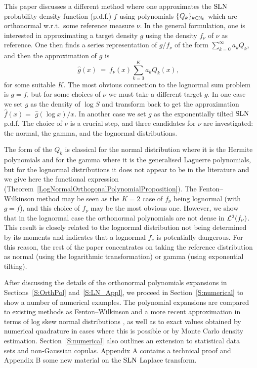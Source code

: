 This paper discusses a different method where one approximates the $\mathrm{SLN}$ probability density function (p.d.f.) $f$ using polynomials $\{Q_k\}_{k\in\mathbb{N}_0}$ which are orthonormal w.r.t.\ some reference
measure $\nu$. In the general formulation, one is interested in approximating a target density $g$ using the density $f_\nu$ of $\nu$
as reference. One then finds
a series representation of $g/f_\nu$ of the form $\sum_{k=0}^\infty a_k Q_k$,
and then the approximation of $g$ is
\begin{equation} \label{orthog_approx}
	\widehat{g}(x)\ =\ f_\nu(x) \sum_{k=0}^K a_k Q_k(x),
\end{equation}
for some suitable $K$.
The most obvious connection to the lognormal sum problem is $g=f$, but for some choices of $\nu$ we must take a different target $g$. In one case we set $g$ as the density of $\log S$ and transform back to get the approximation $\widehat{f}(x)=$
$\widehat{g}(\log x)/x$. In another case we set $g$ as the exponentially tilted $\mathrm{SLN}$ p.d.f.
The choice of $\nu$ is a crucial step, and
three candidates for $\nu$ are investigated: the normal, the gamma, and the lognormal distributions.

The form of the $Q_k$ is classical for the normal distribution where it is the Hermite polynomials and for the gamma where  it is the generalised Laguerre polynomials,
but for the lognormal distributions it does not appear to be in the literature and we give here  the functional expression
(Theorem~\ref{LogNormalOrthogonalPolynomialProposition}). The Fenton--Wilkinson method may be seen
as the $K=2$ case of $f_\nu$ being lognormal (with $g=f$), and this choice of $f_\nu$  may be the most obvious one.
However, we show that in the lognormal case the orthonormal polynomials are not dense in $\mathcal{L}^2(f_\nu)$. This result is closely related
to the lognormal distribution not being determined by its moments
\cite{Heyde63,Berg1984} and indicates that a lognormal $f_\nu$ is potentially dangerous.
For this reason, the rest of the paper concentrates on  taking the reference distribution as normal (using the logarithmic transformation)
or gamma  (using exponential tilting).

After discussing the details of the orthonormal polynomials expansions in Sections~\ref{S:OrthPol} and~\ref{S:LN_Appl},
we proceed in Section~\ref{S:numerical} to show a number of numerical examples. The polynomial expansions
are compared to existing methods as Fenton--Wilkinson and a more recent approximation in terms of log skew normal
distributions \cite{hcine2015highly}, as well as to exact values obtained by numerical quadrature in cases where this
is possible or by Monte Carlo density estimation. Section~\ref{S:numerical} also outlines an extension to  statistical data sets and non-Gaussian copulas. Appendix A contains a technical proof
and Appendix B some new material on the $\mathrm{SLN}$ Laplace transform.

